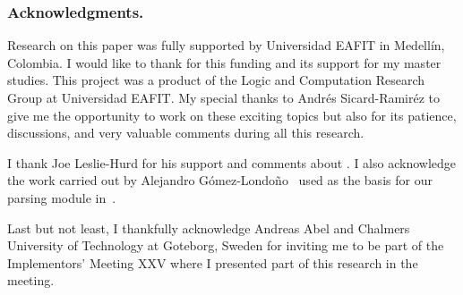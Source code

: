 \documentclass[../main.tex]{subfiles}
\begin{document}

\subsubsection*{Acknowledgments.}

Research on this paper was fully supported by Universidad EAFIT in Medellín,
Colombia. I would like to thank for this funding and its support for
my master studies.
This project was a product of the Logic and Computation
Research Group at Universidad EAFIT.
My special thanks to Andrés Sicard-Ramiréz to give me the opportunity
to work on these exciting topics but also for its patience, discussions,
and very valuable comments during all this research.

I thank Joe Leslie-Hurd for his support and comments about \Metis.
I also acknowledge the work carried out by Alejandro
G\'omez-Londo\~no~\cite{Gomez-Londono2015} used as the basis
for our \TSTP parsing module in~\cite{Athena}.

Last but not least, I thankfully acknowledge
Andreas Abel and Chalmers University of Technology at Goteborg, Sweden for
inviting me to be part of the \Agda Implementors’ Meeting XXV
where I presented part of this research in the meeting.
\end{document}
